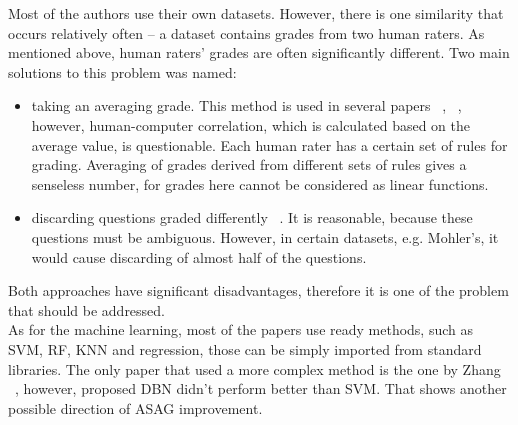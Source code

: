 Most of the authors use their own datasets. However, there is one similarity that occurs relatively often -- a dataset contains grades from two human raters. As mentioned above, human raters' grades are often significantly different. Two main solutions to this problem was named:

\begin{itemize}
\item taking an averaging grade. This method is used in several papers ~\cite{Mohler}, ~\cite{Sultan}, however, human-computer correlation, which is calculated based on the average value, is questionable. Each human rater has a certain set of rules for grading. Averaging of grades derived from different sets of rules gives a senseless number, for grades here cannot be considered as linear functions. 
\item discarding questions graded differently ~\cite{Zbontar}. It is reasonable, because these questions must be ambiguous. However, in certain datasets, e.g. Mohler's, it would cause discarding of almost half of the questions.
\end{itemize}

Both approaches have significant disadvantages, therefore it is one of the problem that should be addressed.\\

As for the machine learning, most of the papers use ready methods, such as SVM, RF, KNN and regression, those can be simply imported from standard libraries. The only paper that used a more complex method is the one by Zhang ~\cite{Zhang}, however, proposed DBN didn't perform better than SVM. That shows another possible direction of ASAG improvement.
